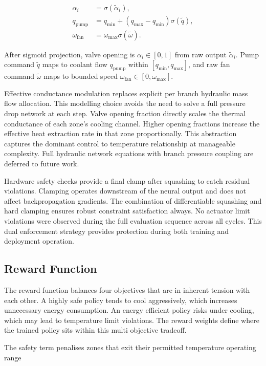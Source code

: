 \documentclass[twocolumn]{article}
\begin{document}
\begin{align}
\alpha_i &= \sigma(\tilde \alpha_i),\\
q_{\mathrm{pump}} &= q_{\min} + (q_{\max} - q_{\min}) \sigma(\tilde q),\\
\omega_{\mathrm{fan}} &= \omega_{\max} \sigma(\tilde \omega).
\end{align}

After sigmoid projection, valve opening is $\alpha_i \in [0, 1]$ from raw output $\tilde \alpha_i$. Pump command $\tilde q$ maps to coolant flow $q_{\mathrm{pump}}$ within $[q_{\min}, q_{\max}]$, and raw fan command $\tilde \omega$ maps to bounded speed $\omega_{\mathrm{fan}} \in [0, \omega_{\max}]$.

Effective conductance modulation replaces explicit per branch hydraulic mass flow allocation. This modelling choice avoids the need to solve a full pressure drop network at each step. Valve opening fraction directly scales the thermal conductance of each zone's cooling channel. Higher opening fractions increase the effective heat extraction rate in that zone proportionally. This abstraction captures the dominant control to temperature relationship at manageable complexity. Full hydraulic network equations with branch pressure coupling are deferred to future work.

Hardware safety checks provide a final clamp after squashing to catch residual violations. Clamping operates downstream of the neural output and does not affect backpropagation gradients. The combination of differentiable squashing and hard clamping ensures robust constraint satisfaction always. No actuator limit violations were observed during the full evaluation sequence across all cycles. This dual enforcement strategy provides protection during both training and deployment operation.

\subsection*{Reward Function}

The reward function balances four objectives that are in inherent tension with each other. A highly safe policy tends to cool aggressively, which increases unnecessary energy consumption. An energy efficient policy risks under cooling, which may lead to temperature limit violations. The reward weights define where the trained policy sits within this multi objective tradeoff.

The safety term penalises zones that exit their permitted temperature operating range
\end{document}
